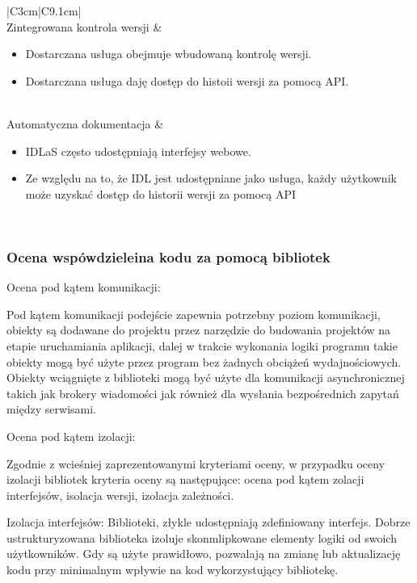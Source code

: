 \documentclass[runningheads,12pt]{llncs}
\begin{document}
\begin{longtable}{|C{3cm}|C{9.1cm}|}
     \\ \hline
    Zintegrowana kontrola wersji &
    \begin{itemize}
      \item Dostarczana usługa obejmuje wbudowaną kontrolę wersji.
      \item Dostarczana usługa daję dostęp do histoii wersji za pomocą API.
    \end{itemize} \\ \hline
    Automatyczna dokumentacja &
    \begin{itemize}
      \item IDLaS często udostępniają interfejsy webowe.
      \item Ze względu na to, że IDL jest udostępniane jako usługa, każdy użytkownik może uzyskać dostęp do historii wersji za pomocą API
    \end{itemize} \\ \hline

\end{longtable}

\subsubsection{Ocena wspówdzieleina kodu za pomocą bibliotek}

Ocena pod kątem komunikacji:

Pod kątem komunikacji podejście zapewnia potrzebny poziom komunikacji, obiekty są dodawane do projektu przez narzędzie do budowania projektów na etapie uruchamiania aplikacji, dalej w trakcie wykonania logiki programu takie obiekty mogą być użyte przez program bez żadnych obciążeń wydajnościowych. Obiekty wciągnięte z biblioteki mogą być użyte dla komunikacji asynchronicznej takich jak brokery wiadomości jak również dla wysłania bezpośrednich zapytań między serwisami.

Ocena pod kątem izolacji:

Zgodnie z wcieśniej zaprezentowanymi kryteriami oceny, w przypadku oceny izolacji bibliotek kryteria oceny są następujące: ocena pod kątem zolacji interfejsów, isolacja wersji, izolacja zależności.

Izolacja interfejsów: Biblioteki, złykle udostępniają zdefiniowany interfejs. Dobrze ustrukturyzowana biblioteka izoluje skonmlipkowane elementy logiki od swoich użytkowników. Gdy są użyte prawidłowo, pozwalają na zmianę lub aktualizację kodu przy minimalnym wpływie na kod wykorzystujący bibliotekę.
\end{document}
